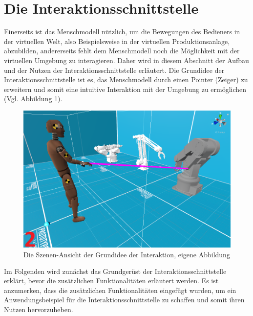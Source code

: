 \section{Die Interaktionsschnittstelle}\label{sec:DieInteraktionsschnittstelle}
Einerseits ist das Menschmodell nützlich, um die Bewegungen des Bedieners in der virtuellen Welt, also Beispielsweise in der virtuellen Produktionsanlage, abzubilden, andererseits fehlt dem Menschmodell noch die Möglichkeit mit der virtuellen Umgebung zu interagieren. Daher wird in diesem Abschnitt der Aufbau und der Nutzen der Interaktionsschnittstelle erläutert. Die Grundidee der Interaktionsschnittstelle ist es, das Menschmodell durch einen Pointer (Zeiger) zu erweitern und somit eine intuitive Interaktion mit der Umgebung zu ermöglichen (Vgl. Abbildung \ref{fig:InteraktionBeispiel}).
\begin{figure}[h]
	\centering
	\includegraphics[width=0.6\linewidth]{Bilder/A44_InteraktionsBeispiel2}
	\caption{Die Szenen-Ansicht der Grundidee der Interaktion, eigene Abbildung}
	\label{fig:InteraktionBeispiel}
\end{figure}
\newline
\noindent Im Folgenden wird zunächst das Grundgerüst der Interaktionsschnittstelle erklärt, bevor die zusätzlichen Funktionalitäten erläutert werden. Es ist anzumerken, dass die zusätzlichen Funktionalitäten eingefügt wurden, um ein Anwendungsbeispiel für die Interaktionsschnittstelle zu schaffen und somit ihren Nutzen hervorzuheben.

